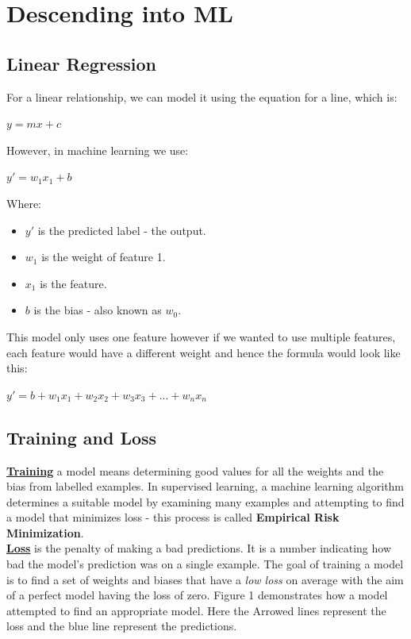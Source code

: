 \documentclass[12pt]{article}
\begin{document}
\section{Descending into ML}
\subsection{Linear Regression}
For a linear relationship, we can model it using the equation for a line, which is:
\begin{center}
$y = mx + c$
\end{center}
However, in machine learning we use:
\begin{center}
$y' = w_1x_1 + b$
\end{center}
Where:
\begin{itemize}
	\item $y'$ is the predicted label - the output.
	\item $w_1$ is the weight of feature 1.
	\item $x_1$ is the feature.
	\item $b$ is the bias - also known as $w_0$.
\end{itemize}

This model only uses one feature however if we wanted to use multiple features, each feature would have a different weight and hence the formula would look like this:
\begin{center}
$y' = b + w_1x_1 + w_2x_2 + w_3x_3 + ... + w_nx_n$
\end{center}
\subsection{Training and Loss}
\href{https://developers.google.com/machine-learning/glossary#training}{\textbf{Training}} a model means determining good values for all the weights and the bias from labelled examples. In supervised learning, a machine learning algorithm determines a suitable model by examining many examples and attempting to find a model that minimizes loss - this process is called \textbf{Empirical Risk Minimization}.
\\ \href{https://developers.google.com/machine-learning/glossary#loss}{\textbf{Loss}} is the penalty of making a bad predictions. It is a number indicating how bad the model's prediction was on a single example. The goal of training a model is to find a set of weights and biases that have a \textit{low loss} on average with the aim of a perfect model having the loss of zero. Figure 1 demonstrates how a model attempted to find an appropriate model. Here the Arrowed lines represent the loss and the blue line represent the predictions.
\end{document}
